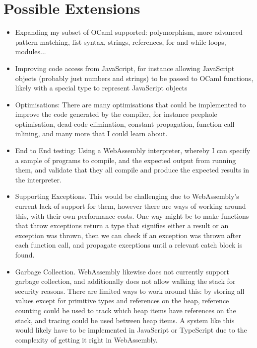 	\section*{Possible Extensions}
	\begin{itemize}
		\item Expanding my subset of OCaml supported: polymorphism, more advanced pattern matching, list syntax, strings, references, for and while loops, modules...
		
		\item Improving code access from JavaScript, for instance allowing JavaScript objects (probably just numbers and strings) to be passed to OCaml functions, likely with a special type to represent JavaScript objects
		
		\item Optimisations: There are many optimisations that could be implemented to improve the code generated by the compiler, for instance peephole optimisation, dead-code elimination, constant propagation, function call inlining, and many more that I could learn about.
		
		\item End to End testing: Using a WebAssembly interpreter, whereby I can specify a sample of programs to compile, and the expected output from running them, and validate that they all compile and produce the expected results in the interpreter.
		
		\item Supporting Exceptions. This would be challenging due to WebAssembly's current lack of support for them, however there are ways of working around this, with their own performance costs. One way might be to make functions that throw exceptions return a type that signifies either a result or an exception was thrown, then we can check if an exception was thrown after each function call, and propagate exceptions until a relevant catch block is found.
		
		\item Garbage Collection. WebAssembly likewise does not currently support garbage collection, and additionally does not allow walking the stack for security reasons. There are limited ways to work around this: by storing all values except for primitive types and references on the heap, reference counting could be used to track which heap items have references on the stack, and tracing could be used between heap items. A system like this would likely have to be implemented in JavaScript or TypeScript due to the complexity of getting it right in WebAssembly.
		
	\end{itemize}
	
